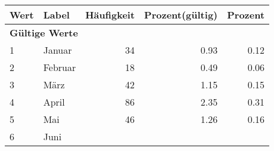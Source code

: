      \begin{longtable}{lXrrr}
     \toprule
     \textbf{Wert} & \textbf{Label} & \textbf{Häufigkeit} & \textbf{Prozent(gültig)} & \textbf{Prozent} \\
     \endhead
     \midrule
     \multicolumn{5}{l}{\textbf{Gültige Werte}}\\

     1 &
     \multicolumn{1}{X}{ Januar   } &


       \num{34} &
       \num[round-mode=places,round-precision=2]{0,93} &
         \num[round-mode=places,round-precision=2]{0,12} \\

     2 &
     \multicolumn{1}{X}{ Februar   } &


       \num{18} &
       \num[round-mode=places,round-precision=2]{0,49} &
         \num[round-mode=places,round-precision=2]{0,06} \\

     3 &
     \multicolumn{1}{X}{ März   } &


       \num{42} &
       \num[round-mode=places,round-precision=2]{1,15} &
         \num[round-mode=places,round-precision=2]{0,15} \\

     4 &
     \multicolumn{1}{X}{ April   } &


       \num{86} &
       \num[round-mode=places,round-precision=2]{2,35} &
         \num[round-mode=places,round-precision=2]{0,31} \\

     5 &
     \multicolumn{1}{X}{ Mai   } &


       \num{46} &
       \num[round-mode=places,round-precision=2]{1,26} &
         \num[round-mode=places,round-precision=2]{0,16} \\

     6 &
     \multicolumn{1}{X}{ Juni   } &



\end{longtable}
